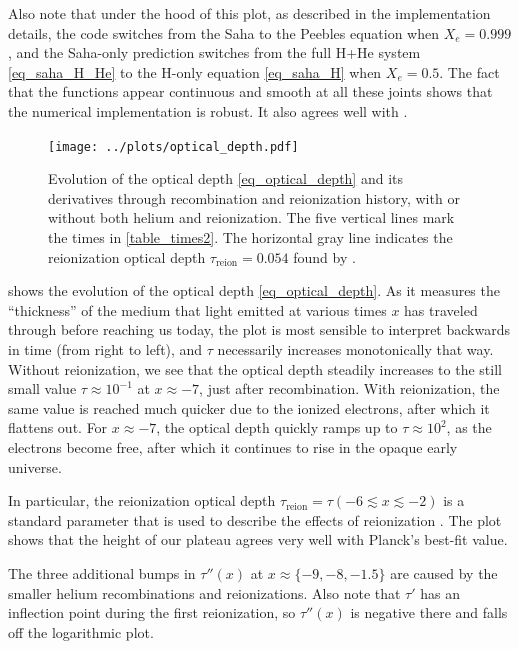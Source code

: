 \documentclass[10pt,a4paper]{article}
\begin{document}
Also note that under the hood of this plot, as described in the implementation details,
the code switches from the Saha to the Peebles equation when $X_e = 0.999$,
and the Saha-only prediction switches from the full H+He system \eqref{eq_saha_H_He} to the H-only equation \eqref{eq_saha_H} when $X_e = 0.5$.
The fact that the functions appear continuous and smooth at all these joints shows that the numerical implementation is robust.
It also agrees well with \cite[\textsc{fig. 1}]{callinHowCalculateCMB2006}.

\begin{figure}
	\centering
	\texttt{[image: ../plots/optical\_depth.pdf]}
	\caption{%
		Evolution of the optical depth \eqref{eq_optical_depth} and its derivatives through recombination and reionization history, with or without both helium and reionization.
		The five vertical lines mark the times in \cref{table_times2}.
		The horizontal gray line indicates the reionization optical depth $\tau_\text{reion}=0.054$ found by \cite{planckcollaborationPlanck2018Results2020}.
	}
	\label{fig_optical_depth}
\end{figure}

 shows the evolution of the optical depth \eqref{eq_optical_depth}.
As it measures the ``thickness'' of the medium that light emitted at various times $x$ has traveled through before reaching us today,
the plot is most sensible to interpret backwards in time (from right to left), and $\tau$ necessarily increases monotonically that way.
Without reionization, we see that the optical depth steadily increases to the still small value $\tau \approx 10^{-1}$ at $x \approx -7$, just after recombination.
With reionization, the same value is reached much quicker due to the ionized electrons, after which it flattens out.
For $x \approx -7$, the optical depth quickly ramps up to $\tau \approx 10^{2}$, as the electrons become free,
after which it continues to rise in the opaque early universe.

In particular, the reionization optical depth $\tau_\text{reion} = \tau(-6 \lesssim x \lesssim -2)$
is a standard parameter that is used to describe the effects of reionization \cite[section 9.7]{dodelsonModernCosmology2021}.
The plot shows that the height of our plateau agrees very well with Planck's best-fit value.

The three additional bumps in $\tau''(x)$ at $x \approx \{-9, -8, -1.5\}$ are caused by the smaller helium recombinations and reionizations.
Also note that $\tau'$ has an inflection point during the first reionization,
so $\tau''(x)$ is negative there and falls off the logarithmic plot.
\end{document}
